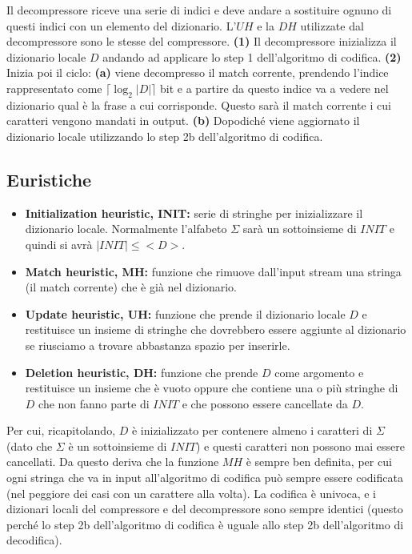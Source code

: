 Il decompressore riceve una serie di indici e deve andare a sostituire ognuno di questi indici con un elemento del dizionario. L'\(UH\) e la \(DH\) utilizzate dal decompressore sono le stesse del compressore. \textbf{(1)} Il decompressore inizializza il dizionario locale \(D\) andando ad applicare lo step 1 dell'algoritmo di codifica. \textbf{(2)} Inizia poi il ciclo: \textbf{(a)} viene decompresso il match corrente, prendendo l'indice rappresentato come \(\lceil \log_2 |D| \rceil\) bit e a partire da questo indice va a vedere nel dizionario qual è la frase a cui corrisponde. Questo sarà il match corrente i cui caratteri vengono mandati in output. \textbf{(b)} Dopodiché viene aggiornato il dizionario locale utilizzando lo step 2b dell'algoritmo di codifica.

\subsection{Euristiche}
\begin{itemize}
    \item \textbf{Initialization heuristic, INIT:} serie di stringhe per inizializzare il dizionario locale. Normalmente l'alfabeto \(\Sigma\) sarà un sottoinsieme di \(INIT\) e quindi si avrà \(|INIT| \leq <D>\).
    \item \textbf{Match heuristic, MH:} funzione che rimuove dall'input stream una stringa (il match corrente) che è già nel dizionario.
    \item \textbf{Update heuristic, UH:} funzione che prende il dizionario locale \(D\) e restituisce un insieme di stringhe che dovrebbero essere aggiunte al dizionario se riusciamo a trovare abbastanza spazio per inserirle.
    \item \textbf{Deletion heuristic, DH:} funzione che prende \(D\) come argomento e restituisce un insieme che è vuoto oppure che contiene una o più stringhe di \(D\) che non fanno parte di \(INIT\) e che possono essere cancellate da \(D\).
\end{itemize}

Per cui, ricapitolando, \(D\) è inizializzato per contenere almeno i caratteri di \(\Sigma\) (dato che \(\Sigma\) è un sottoinsieme di \(INIT\)) e questi caratteri non possono mai essere cancellati. Da questo deriva che la funzione \(MH\) è sempre ben definita, per cui ogni stringa che va in input all'algoritmo di codifica può sempre essere codificata (nel peggiore dei casi con un carattere alla volta). La codifica è univoca, e i dizionari locali del compressore e del decompressore sono sempre identici (questo perché lo step 2b dell'algoritmo di codifica è uguale allo step 2b dell'algoritmo di decodifica).

